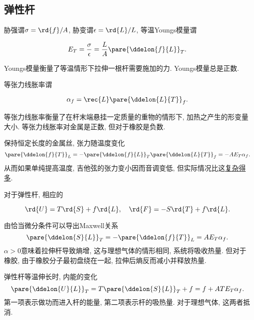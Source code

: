 \documentclass[../Thermal.tex]{subfiles}
\begin{document}
\subsection{弹性杆}
\begin{definition}[等温Youngs模量]
胁强谓$\sigma = \rd{f}/A$, 胁变谓$\epsilon = \rd{L}/L$, 等温Youngs模量谓
\begin{finale}
\[ E_T = \frac{\sigma}{\epsilon} = \frac{L}{A}\pare{\ddelon{f}{L}}_T. \]
\end{finale}
\end{definition}
Youngs模量衡量了等温情形下拉伸一根杆需要施加的力. Youngs模量总是正数.
\begin{definition}[等张力线胀率]
等张力线胀率谓
\begin{finale}
\[ \alpha_f = \rec{L} \pare{\ddelon{L}{T}}_f. \]
\end{finale}
\end{definition}
等张力线胀率衡量了在杆末端悬挂一定质量的重物的情形下, 加热之产生的形变量大小. 等张力线胀率对金属是正数, 但对于橡胶是负数.
\begin{ex}
保持恒定长度的金属丝, 张力随温度变化
\[ \pare{\ddelon{f}{T}}_L = -\pare{\ddelon{f}{L}}_T\pare{\ddelon{L}{T}}_f = -AE_T\alpha_f. \]
从而如果单纯提高温度, 吉他弦的张力变小因而音调变低, 但实际情况比这\href{https://www.zhihu.com/question/64200607}{复杂得多}.
\end{ex}
对于弹性杆, 相应的
\begin{finale}
\[ \rd{U} = T \rd{S} + f \rd{L},\quad \rd{F} = -S\rd{T} + f\rd{L}. \]
\end{finale}
由恰当微分条件可以导出Maxwell关系
\[ \pare{\ddelon{S}{L}}_T = -\pare{\ddelon{f}{T}}_L = AE_T\alpha_f. \]
$\alpha>0$意味着拉伸杆导致熵增, 这与理想气体的情形相同, 系统将吸收热量. 但对于橡胶, 由于橡胶分子最初盘绕在一起, 拉伸后熵反而减小并释放热量.
\begin{ex}
弹性杆等温伸长时, 内能的变化
\[ \pare{\ddelon{U}{L}}_T = T\pare{\ddelon{S}{L}}_T + f = f + ATE_T \alpha_f. \]
第一项表示做功而进入杆的能量, 第二项表示杆的吸热量. 对于理想气体, 这两者抵消.
\end{ex}
\end{document}
